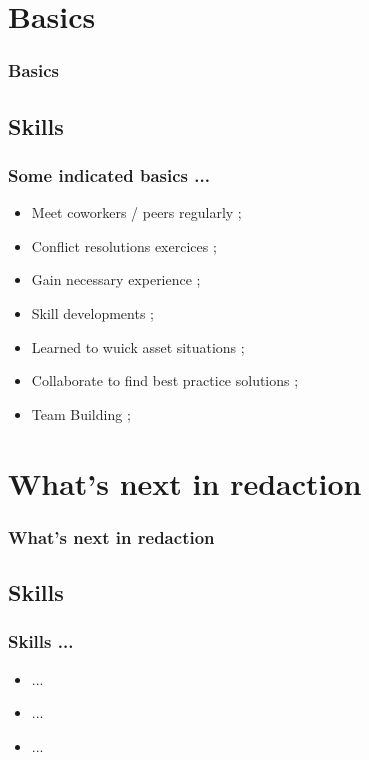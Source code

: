\documentclass[slidetop,11pt]{beamer}
\begin{document}
\def\sectionIItitle{Basics}
\section{ \sectionIItitle }
\begin{frame}
	\frametitle{ \sectionIItitle }
	\tableofcontents[sections=2,currentsection,subsectionstyle=show/shaded/hide]
\end{frame} 

\subsection{ Skills }
\begin{frame}
	\frametitle{ Some indicated basics ... }
	\begin{itemize}
		\item Meet coworkers / peers regularly ; 
		\item Conflict resolutions exercices ;  
		\item Gain necessary experience ; 
		\item Skill developments ; 
		\item Learned to wuick asset situations ; 
		\item Collaborate to find best practice solutions ; 
		\item Team Building ; 
	\end{itemize}
\end{frame}

\def\sectionIIItitle{What's next in redaction}
\section{ \sectionIIItitle }
\begin{frame}
	\frametitle{ \sectionIIItitle }
	\tableofcontents[sections=3,currentsection,subsectionstyle=show/shaded/hide]
\end{frame} 

\subsection{ Skills }
\begin{frame}
	\frametitle{ Skills ... }
	\begin{itemize}
		\item ... 
		\item ... 
		\item ... 
	\end{itemize}
\end{frame}
\end{document}
